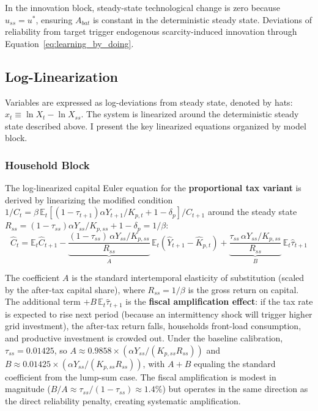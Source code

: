 \documentclass[12pt, a4paper]{article}
\begin{document}
	In the innovation block, steady-state technological change is zero because $u_{ss} = u^*$, ensuring $A_{bat}$ is constant in the deterministic steady state. Deviations of reliability from target trigger endogenous scarcity-induced innovation through Equation~\eqref{eq:learning_by_doing}.
	
	\subsection{Log-Linearization}
	
	Variables are expressed as log-deviations from steady state, denoted by hats: $\hat{x}_t \equiv \ln X_t - \ln X_{ss}$. The system is linearized around the deterministic steady state described above. I present the key linearized equations organized by model block.
	
	\subsubsection{Household Block}
	
	The log-linearized capital Euler equation for the \textbf{proportional tax variant} is derived by linearizing the modified condition $1/C_t = \beta\,\mathbb{E}_t[(1-\tau_{t+1})\alpha Y_{t+1}/K_{p,t} + 1 - \delta_p]/C_{t+1}$ around the steady state $R_{ss} = (1-\tau_{ss})\alpha Y_{ss}/K_{p,ss} + 1 - \delta_p = 1/\beta$:
	\begin{equation}
		\hat{C}_t = \mathbb{E}_t \hat{C}_{t+1}
		- \underbrace{\frac{(1-\tau_{ss})\,\alpha Y_{ss}/K_{p,ss}}{R_{ss}}}_{A}\, \mathbb{E}_t \!\left(\hat{Y}_{t+1} - \hat{K}_{p,t}\right)
		+ \underbrace{\frac{\tau_{ss}\,\alpha Y_{ss}/K_{p,ss}}{R_{ss}}}_{B}\, \mathbb{E}_t \hat{\tau}_{t+1}
		\label{eq:euler_lin}
	\end{equation}
	
	The coefficient $A$ is the standard intertemporal elasticity of substitution (scaled by the after-tax capital share), where $R_{ss} = 1/\beta$ is the gross return on capital. The additional term $+B\,\mathbb{E}_t\hat{\tau}_{t+1}$ is the \textbf{fiscal amplification effect}: if the tax rate is expected to rise next period (because an intermittency shock will trigger higher grid investment), the after-tax return falls, households front-load consumption, and productive investment is crowded out. Under the baseline calibration, $\tau_{ss} = 0.01425$, so $A \approx 0.9858 \times (\alpha Y_{ss}/(K_{p,ss}R_{ss}))$ and $B \approx 0.01425 \times (\alpha Y_{ss}/(K_{p,ss}R_{ss}))$, with $A + B$ equaling the standard coefficient from the lump-sum case. The fiscal amplification is modest in magnitude ($B/A \approx \tau_{ss}/(1-\tau_{ss}) \approx 1.4\%$) but operates in the same direction as the direct reliability penalty, creating systematic amplification.
	
\end{document}
